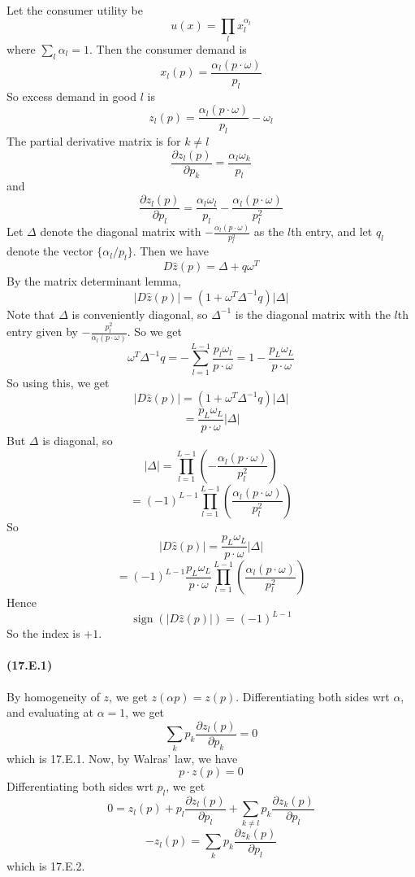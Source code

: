 \documentclass[10pt,letter]{article}
\DeclareMathOperator{\sign}{sign}
\begin{document}
Let the consumer utility be
\[ u(x) = \prod_l x_l^{\alpha_l} \]
where $\sum_l \alpha_l = 1$. Then the consumer demand is
\[ x_l(p) = \frac{\alpha_l (p \cdot \omega)}{p_l} \]
So excess demand in good $l$ is
\[ z_l(p) = \frac{\alpha_l (p \cdot \omega)}{p_l} - \omega_l \]
The partial derivative matrix is for $k \neq l$
\[ \frac{\partial z_l(p)}{\partial p_k} = \frac{\alpha_l \omega_k}{p_l} \]
and
\[ \frac{\partial z_l(p)}{\partial p_l} = \frac{\alpha_l \omega_l}{p_l} -\frac{ \alpha_l (p \cdot \omega)}{p_l^2} \]
Let $\Delta$ denote the diagonal matrix with $-\frac{ \alpha_l (p \cdot \omega)}{p_l^2}$ as the $l$th entry, and let $q_l$ denote the vector $\{ \alpha_l/p_l \}$. Then we have
\[ D\hat{z}(p) = \Delta + q \omega^T  \]
By the matrix determinant lemma,
\[ |D\hat{z}(p)| = (1 + \omega^T \Delta^{-1} q) |\Delta| \]
Note that $\Delta$ is conveniently diagonal, so $\Delta^{-1}$ is the diagonal matrix with the $l$th entry given by $-\frac{p_l^2}{ \alpha_l (p \cdot \omega)}$. So we get
\[ \omega^T \Delta^{-1}q = - \sum_{l=1}^{L-1} \frac{p_l \omega_l}{p \cdot \omega} = 1 - \frac{p_L \omega_L}{ p \cdot \omega} \]
So using this, we get
\[ |D\hat{z}(p)| = (1 + \omega^T \Delta^{-1} q) |\Delta| \]
\[ = \frac{p_L \omega_L}{ p \cdot \omega}|\Delta| \]
But $\Delta$ is diagonal, so
\[ |\Delta| = \prod_{l=1}^{L-1} \left(-\frac{ \alpha_l (p \cdot \omega)}{p_l^2} \right) \]
\[ = (-1)^{L-1} \prod_{l=1}^{L-1} \left(\frac{ \alpha_l (p \cdot \omega)}{p_l^2} \right) \]
So
\[ |D\hat{z}(p)| = \frac{p_L \omega_L}{ p \cdot \omega}|\Delta| \]
\[ = (-1)^{L-1} \frac{p_L \omega_L}{ p \cdot \omega} \prod_{l=1}^{L-1} \left(\frac{ \alpha_l (p \cdot \omega)}{p_l^2} \right) \]
Hence
\[ \sign(|D\hat{z}(p)|) = (-1)^{L-1} \]
So the index is $+1$.


\paragraph{(17.E.1)}
By homogeneity of $z$, we get $z(\alpha p ) = z(p)$. Differentiating both sides wrt $\alpha$, and evaluating at $\alpha = 1$, we get
\[ \sum_k p_k \frac{\partial z_l(p)}{\partial p_k} =  0 \]
which is 17.E.1. Now, by Walras' law, we have
\[ p \cdot z(p) = 0 \]
Differentiating both sides wrt $p_l$, we get
\[ 0 = z_l(p) + p_l \frac{\partial z_l(p)}{ \partial p_l} + \sum_{k\neq l} p_k \frac{\partial z_k(p)}{\partial p_l} \]
\[ -z_l(p) = \sum_{k} p_k \frac{\partial z_k(p)}{\partial p_l} \]
which is 17.E.2.
\end{document}
